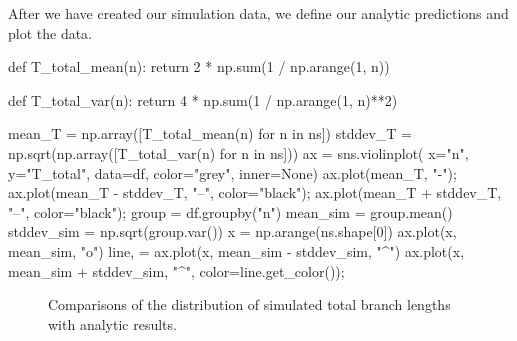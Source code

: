 \documentclass[graybox]{svmult}
\begin{document}
After we have created our simulation data, we define our analytic
predictions and plot the data.

\begin{pythoncode}
def T_total_mean(n):
    return 2 * np.sum(1 / np.arange(1, n))

def T_total_var(n):
    return 4 * np.sum(1 / np.arange(1, n)**2)

mean_T = np.array([T_total_mean(n) for n in ns])
stddev_T = np.sqrt(np.array([T_total_var(n) for n in ns]))
ax = sns.violinplot(
    x="n", y="T_total", data=df, color="grey", inner=None)
ax.plot(mean_T, "-");
ax.plot(mean_T - stddev_T, "--", color="black");
ax.plot(mean_T + stddev_T, "--", color="black");
group = df.groupby("n")
mean_sim = group.mean()
stddev_sim = np.sqrt(group.var())
x = np.arange(ns.shape[0])
ax.plot(x, mean_sim, "o")
line, = ax.plot(x, mean_sim - stddev_sim, "^")
ax.plot(x, mean_sim + stddev_sim, "^", color=line.get_color());
\end{pythoncode}


\begin{figure}[t]
\centering
{}
\qquad\qquad
{}
\caption{\label{fig-segsites-norecomb}
Comparisons of the distribution of simulated total branch lengths
with analytic results.
}
\end{figure}
\end{document}

